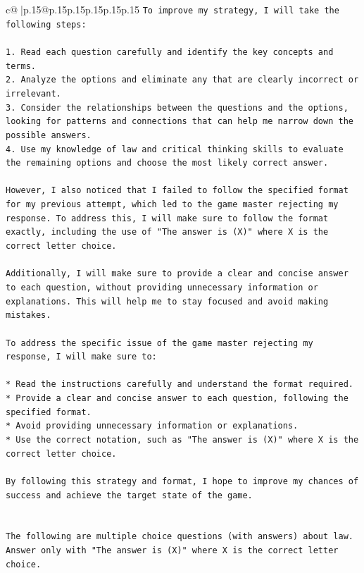 \documentclass{article}
\begin{document}
{\begin{supertabular}{c@{$\;$}|p{.15\linewidth}@{}p{.15\linewidth}p{.15\linewidth}p{.15\linewidth}p{.15\linewidth}p{.15\linewidth}}
{{{\texttt{To improve my strategy, I will take the following steps:} \\
\\ 
\texttt{1.  Read each question carefully and identify the key concepts and terms.} \\
\texttt{2.  Analyze the options and eliminate any that are clearly incorrect or irrelevant.} \\
\texttt{3.  Consider the relationships between the questions and the options, looking for patterns and connections that can help me narrow down the possible answers.} \\
\texttt{4.  Use my knowledge of law and critical thinking skills to evaluate the remaining options and choose the most likely correct answer.} \\
\\ 
\texttt{However, I also noticed that I failed to follow the specified format for my previous attempt, which led to the game master rejecting my response. To address this, I will make sure to follow the format exactly, including the use of "The answer is (X)" where X is the correct letter choice.} \\
\\ 
\texttt{Additionally, I will make sure to provide a clear and concise answer to each question, without providing unnecessary information or explanations. This will help me to stay focused and avoid making mistakes.} \\
\\ 
\texttt{To address the specific issue of the game master rejecting my response, I will make sure to:} \\
\\ 
\texttt{*   Read the instructions carefully and understand the format required.} \\
\texttt{*   Provide a clear and concise answer to each question, following the specified format.} \\
\texttt{*   Avoid providing unnecessary information or explanations.} \\
\texttt{*   Use the correct notation, such as "The answer is (X)" where X is the correct letter choice.} \\
\\ 
\texttt{By following this strategy and format, I hope to improve my chances of success and achieve the target state of the game.} \\
\\ 
\\ 
\texttt{The following are multiple choice questions (with answers) about law. Answer only with "The answer is (X)" where X is the correct letter choice.} \\
}}}
\end{supertabular}}
\end{document}
